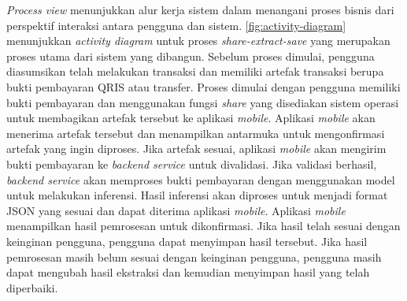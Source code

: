 \emph{Process view} menunjukkan alur kerja sistem dalam menangani proses bisnis dari perspektif interaksi antara pengguna dan sistem. \autoref{fig:activity-diagram} menunjukkan \emph{activity diagram} untuk proses \emph{share-extract-save} yang merupakan proses utama dari sistem yang dibangun. Sebelum proses dimulai, pengguna diasumsikan telah melakukan transaksi dan memiliki artefak transaksi berupa bukti pembayaran QRIS atau transfer. Proses dimulai dengan pengguna memiliki bukti pembayaran dan menggunakan fungsi \emph{share} yang disediakan sistem operasi untuk membagikan artefak tersebut ke aplikasi \emph{mobile}. Aplikasi \emph{mobile} akan menerima artefak tersebut dan menampilkan antarmuka untuk mengonfirmasi artefak yang ingin diproses. Jika artefak sesuai, aplikasi \emph{mobile} akan mengirim bukti pembayaran ke \emph{backend service} untuk divalidasi. Jika validasi berhasil, \emph{backend service} akan memproses bukti pembayaran dengan menggunakan model \donut{} untuk melakukan inferensi. Hasil inferensi akan diproses untuk menjadi format JSON yang sesuai dan dapat diterima aplikasi \emph{mobile}. Aplikasi \emph{mobile} menampilkan hasil pemrosesan untuk dikonfirmasi. Jika hasil telah sesuai dengan keinginan pengguna, pengguna dapat menyimpan hasil tersebut. Jika hasil pemrosesan masih belum sesuai dengan keinginan pengguna, pengguna masih dapat mengubah hasil ekstraksi dan kemudian menyimpan hasil yang telah diperbaiki.
